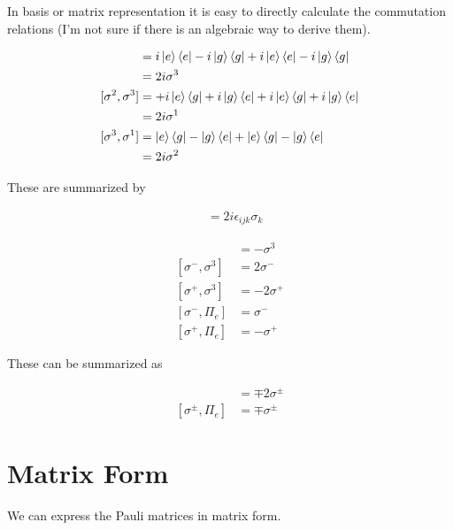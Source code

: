 \documentclass[12pt]{article}
\begin{document}
In basis or matrix representation it is easy to directly calculate the commutation relations (I'm not sure if there is an algebraic way to derive them).

\begin{align}
[\sigma^1, \sigma^2] &= i \ket{e}\bra{e}  - i \ket{g}\bra{g} +i \ket{e}\bra{e} - i \ket{g}\bra{g}\\
&= 2i \sigma^3\\
[\sigma^2, \sigma^3] &= +i\ket{e}\bra{g} +i\ket{g}\bra{e} +i\ket{e}\bra{g} +i\ket{g}\bra{e}\\
&= 2i \sigma^1\\
[\sigma^3, \sigma^1] &= \ket{e}\bra{g} - \ket{g}\bra{e} +\ket{e}\bra{g} - \ket{g}\bra{e}\\
&= 2i \sigma^2
\end{align}

These are summarized by

\begin{align}
[\sigma_i, \sigma_j] &= 2i\epsilon_{ijk} \sigma_k
\end{align}

\begin{align}
[\sigma^-, \sigma^+] &= - \sigma^3\\
[\sigma^-, \sigma^3] &= 2\sigma^-\\
[\sigma^+, \sigma^3] &= -2\sigma^+\\
[\sigma^-, \Pi_e] &= \sigma^-\\
[\sigma^+, \Pi_e] &= -\sigma^+
\end{align}

These can be summarized as

\begin{align}
[\sigma^{\pm},\sigma^3] &= \mp 2\sigma^{\pm}\\
[\sigma^{\pm},\Pi_e]&= \mp \sigma^{\pm}
\end{align}

\section{Matrix Form}

We can express the Pauli matrices in matrix form.
\end{document}
